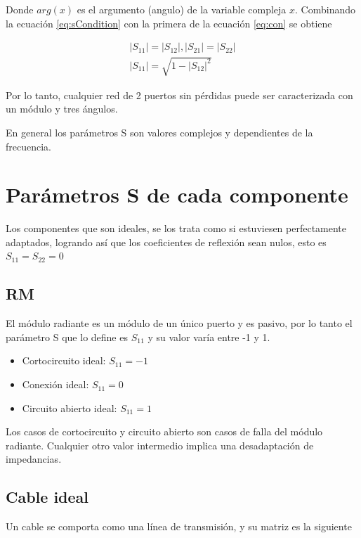 \begin{itemize}
Donde $arg(x)$ es el argumento (angulo) de la variable compleja $x$. Combinando la ecuación \ref{eq:sCondition} con la primera 
de la ecuación \ref{eq:con} se obtiene

\begin{equation}
\begin{aligned}
	|S_{11}| = |S_{12}|, |S_{21}| = |S_{22}| \\
	|S_{11}| = \sqrt{1 - |S_{12}|^2}
\end{aligned}
\end{equation}

Por lo tanto, cualquier red de 2 puertos sin pérdidas puede ser caracterizada con un módulo y tres ángulos.
\end{itemize}

En general los parámetros S son valores complejos y dependientes de la frecuencia. 

\section{Parámetros S de cada componente}

Los componentes que son ideales, se los trata como si estuviesen perfectamente adaptados, logrando así que los coeficientes
de reflexión sean nulos, esto es $S_{11} = S_{22} = 0$

\subsection{RM}
	
El módulo radiante es un módulo de un único puerto y es pasivo, por lo tanto el parámetro S que lo define es $S_{11}$ y su 
valor varía entre -1 y 1.

\begin{itemize}
	\item Cortocircuito ideal: $S_{11} = -1$
	\item Conexión ideal: $S_{11} = 0$
	\item Circuito abierto ideal: $S_{11} = 1$
\end{itemize}

Los casos de cortocircuito y circuito abierto son casos de falla del módulo radiante. Cualquier otro valor intermedio implica
una desadaptación de impedancias.

\subsection{Cable ideal}
Un cable se comporta como una línea de transmisión, y su matriz es la siguiente

